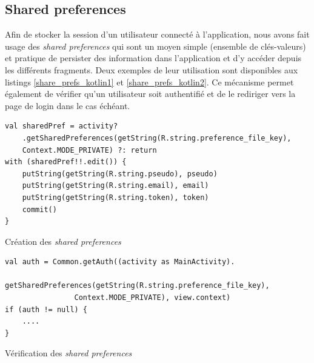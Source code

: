 \subsection{Shared preferences}
Afin de stocker la session d'un utilisateur connecté à l'application, nous avons fait usage des \textit{shared preferences} qui sont un moyen simple (ensemble de clés-valeurs) et pratique de persister des information dans l'application et d'y accéder depuis les différents fragments. Deux exemples de leur utilisation sont disponibles aux listings \ref{share_prefs_kotlin1} et \ref{share_prefs_kotlin2}. Ce mécanisme permet également de vérifier qu'un utilisateur soit authentifié et de le rediriger vers la page de login dans le cas échéant.
\bigbreak
\begin{code}
    \begin{verbatim}
val sharedPref = activity?
    .getSharedPreferences(getString(R.string.preference_file_key), 
    Context.MODE_PRIVATE) ?: return
with (sharedPref!!.edit()) {
    putString(getString(R.string.pseudo), pseudo)
    putString(getString(R.string.email), email)
    putString(getString(R.string.token), token)
    commit()
}
    \end{verbatim}
    \caption{Création des \textit{shared preferences}}
    \label{share_prefs_kotlin1}
\end{code}
\bigbreak

\bigbreak
\begin{code}
    \begin{verbatim}
val auth = Common.getAuth((activity as MainActivity).
                getSharedPreferences(getString(R.string.preference_file_key),
                Context.MODE_PRIVATE), view.context)
if (auth != null) {
    ....
}
    \end{verbatim}
    \caption{Vérification des \textit{shared preferences}}
    \label{share_prefs_kotlin2}
\end{code}
\bigbreak

